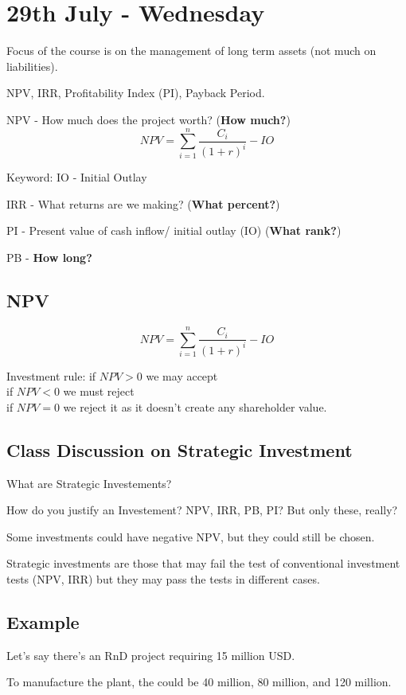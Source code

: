 \documentclass{article}
\begin{document}
\section{29th July - Wednesday}

Focus of the course is on the management of long term assets (not much on liabilities).

NPV, IRR, Profitability Index (PI), Payback Period.

NPV - How much does the project worth? (\textbf{How much?})
\[NPV = \sum_{i = 1}^{n} \frac{C_i}{(1+r)^i} - IO\]

Keyword: IO - Initial Outlay

IRR - What returns are we making? (\textbf{What percent?})

PI - Present value of cash inflow/ initial outlay (IO) (\textbf{What rank?})

PB - \textbf{How long?}

\subsection{NPV} 

\[NPV = \sum_{i = 1}^{n} \frac{C_i}{(1+r)^i} - IO\]

Investment rule:  if $NPV > 0$ we may accept \\
if $NPV < 0$ we must reject \\
if $NPV = 0$ we reject it as it doesn't create any shareholder value.\\

\subsection{Class Discussion on Strategic Investment}
What are Strategic Investements?

How do you justify an Investement? NPV, IRR, PB, PI? But only these, really?

Some investments could have negative NPV, but they could still be chosen.

Strategic investments are those that may fail the test of conventional investment tests (NPV, IRR) but they may pass the tests in different cases.

\subsection{Example}
Let's say there's an RnD project requiring 15 million USD. 

To manufacture the plant, the could be 40 million, 80 million, and 120 million.
\end{document}
